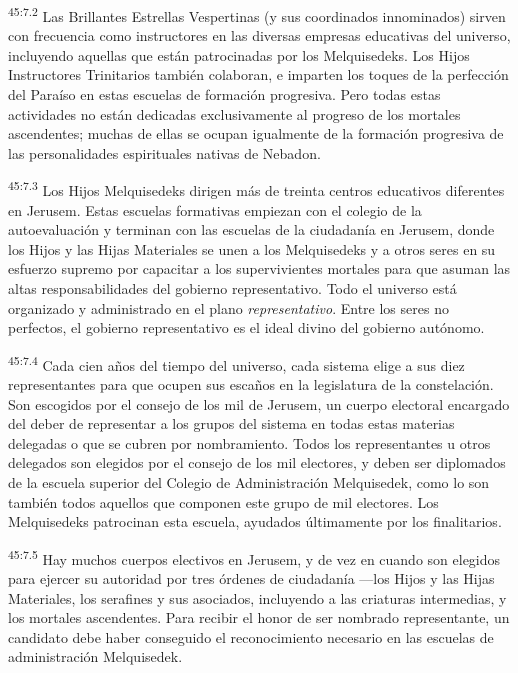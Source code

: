 \par
\textsuperscript{45:7.2} Las Brillantes Estrellas Vespertinas (y sus coordinados innominados) sirven con frecuencia como instructores en las diversas empresas educativas del universo, incluyendo aquellas que están patrocinadas por los Melquisedeks. Los Hijos Instructores Trinitarios también colaboran, e imparten los toques de la perfección del Paraíso en estas escuelas de formación progresiva. Pero todas estas actividades no están dedicadas exclusivamente al progreso de los mortales ascendentes; muchas de ellas se ocupan igualmente de la formación progresiva de las personalidades espirituales nativas de Nebadon.

\par
\textsuperscript{45:7.3} Los Hijos Melquisedeks dirigen más de treinta centros educativos diferentes en Jerusem. Estas escuelas formativas empiezan con el colegio de la autoevaluación y terminan con las escuelas de la ciudadanía en Jerusem, donde los Hijos y las Hijas Materiales se unen a los Melquisedeks y a otros seres en su esfuerzo supremo por capacitar a los supervivientes mortales para que asuman las altas responsabilidades del gobierno representativo. Todo el universo está organizado y administrado en el plano \textit{representativo}. Entre los seres no perfectos, el gobierno representativo es el ideal divino del gobierno autónomo.

\par
\textsuperscript{45:7.4} Cada cien años del tiempo del universo, cada sistema elige a sus diez representantes para que ocupen sus escaños en la legislatura de la constelación. Son escogidos por el consejo de los mil de Jerusem, un cuerpo electoral encargado del deber de representar a los grupos del sistema en todas estas materias delegadas o que se cubren por nombramiento. Todos los representantes u otros delegados son elegidos por el consejo de los mil electores, y deben ser diplomados de la escuela superior del Colegio de Administración Melquisedek, como lo son también todos aquellos que componen este grupo de mil electores. Los Melquisedeks patrocinan esta escuela, ayudados últimamente por los finalitarios.

\par
\textsuperscript{45:7.5} Hay muchos cuerpos electivos en Jerusem, y de vez en cuando son elegidos para ejercer su autoridad por tres órdenes de ciudadanía ---los Hijos y las Hijas Materiales, los serafines y sus asociados, incluyendo a las criaturas intermedias, y los mortales ascendentes. Para recibir el honor de ser nombrado representante, un candidato debe haber conseguido el reconocimiento necesario en las escuelas de administración Melquisedek.

